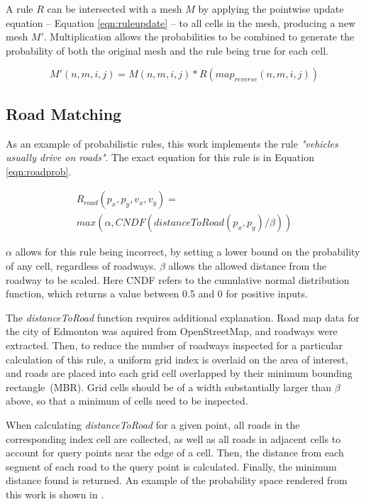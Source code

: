 A rule $R$ can be intersected with a mesh $M$ by applying the pointwise update equation -- Equation \ref{eqn:ruleupdate} -- to all cells in the mesh, producing a new mesh $M'$. Multiplication allows the probabilities to be combined to generate the probability of both the original mesh and the rule being true for each cell.

\begin{equation} \label{eqn:ruleupdate}
    M'(n, m, i, j) = M(n, m, i, j) * R(map_{reverse}(n,m,i,j))
\end{equation}

\subsection{Road Matching}

As an example of probabilistic rules, this work implements the rule \textit{"vehicles usually drive on roads"}. The exact equation for this rule is in Equation \ref{eqn:roadprob}.

\begin{equation} \label{eqn:roadprob}
    \begin{gathered}
    R_{road}(p_x, p_y, v_x, v_y) = \\
        \textit{max}(\alpha, \textit{CNDF}(\textit{distanceToRoad}(p_x, p_y)/\beta))
    \end{gathered}
\end{equation}

$\alpha$ allows for this rule being incorrect, by setting a lower bound on the probability of any cell, regardless of roadways. $\beta$ allows the allowed distance from the roadway to be scaled. Here CNDF refers to the cumulative normal distribution function, which returns a value between 0.5 and 0 for positive inputs.

The \textit{distanceToRoad} function requires additional explanation.
Road map data for the city of Edmonton was aquired from OpenStreetMap, and roadways were extracted. Then, to reduce the number of roadways inspected for a particular calculation of this rule, a uniform grid index is overlaid on the area of interest, and roads are placed into each grid cell overlapped by their minimum bounding rectangle~(MBR). Grid cells should be of a width substantially larger than $\beta$ above, so that a minimum of cells need to be inspected.

When calculating \textit{distanceToRoad} for a given point, all roads in the corresponding index cell are collected, as well as all roads in adjacent cells to account for query points near the edge of a cell. Then, the distance from each segment of each road to the query point is calculated. Finally, the minimum distance found is returned. An example of the probability space rendered from this work is shown in .


